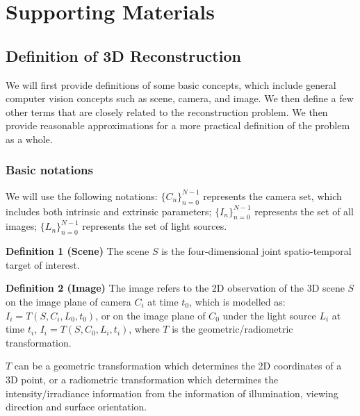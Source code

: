 \chapter{Supporting Materials}


\section{Definition of 3D Reconstruction}
\label{sec:3DRecon_Def}
We will first provide definitions of some basic concepts, which include general computer vision concepts such as scene, camera, and image. We then define a few other terms that are closely related to the reconstruction problem. We then provide reasonable approximations for a more practical definition of the problem as a whole.

\subsection{Basic notations}
We will use the following notations: $\{C_n\}_{n=0}^{N-1}$ represents the camera set, which includes both intrinsic and extrinsic parameters; $\{I_n\}_{n=0}^{N-1}$ represents the set of all images; $\{L_n\}_{n=0}^{N-1}$ represents the set of light sources.

\noindent\textbf{Definition 1 (Scene)} The scene $S$ is the four-dimensional joint spatio-temporal target of interest.

\noindent\textbf{Definition 2 (Image)} The image refers to the 2D observation of the 3D scene $S$ on the image plane of camera $C_i$ at time $t_0$, which is modelled as: $I_i = T(S, C_i, L_0, t_0)$, or on the image plane of $C_0$  under the light source $L_i$ at time $t_i$, $I_i= T(S, C_0, L_i, t_i)$, where $T$ is the geometric/radiometric transformation.

$T$ can be a geometric transformation which determines the 2D coordinates of a 3D point, or a radiometric transformation which determines the intensity/irradiance information from the information of illumination, viewing direction and surface orientation.

